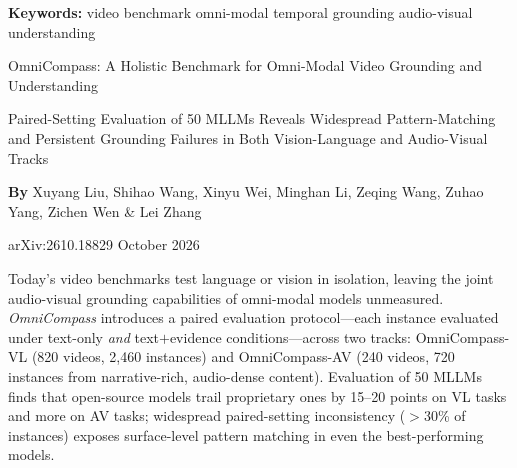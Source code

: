 \documentclass[10pt,twocolumn]{article}
\begin{document}
\setlength{\parindent}{0pt}
\setlength{\parskip}{4pt}

{\small\color{keywordgray}\textbf{Keywords:}
  video benchmark \textbullet{}
  omni-modal \textbullet{}
  temporal grounding \textbullet{}
  audio-visual understanding}\par\vspace{4pt}

{\LARGE\bfseries\raggedright
  OmniCompass: A Holistic Benchmark for Omni-Modal Video Grounding
  and Understanding}\par\vspace{4pt}

{\large\itshape\raggedright
  Paired-Setting Evaluation of 50 MLLMs Reveals Widespread
  Pattern-Matching and Persistent Grounding Failures in Both
  Vision-Language and Audio-Visual Tracks}\par\vspace{6pt}

{\small\textbf{By} Xuyang Liu, Shihao Wang, Xinyu Wei, Minghan Li,
  Zeqing Wang, Zuhao Yang, Zichen Wen \& Lei Zhang}\par\vspace{2pt}

{\small\color{keywordgray}arXiv:2610.18829 \textbullet{} October 2026}
\par\vspace{2pt}\noindent{\color{rulered}\rule{\columnwidth}{0.6pt}}\vspace{6pt}

Today's video benchmarks test language or vision in isolation, leaving
the joint audio-visual grounding capabilities of omni-modal models
unmeasured. \emph{OmniCompass} introduces a paired evaluation
protocol---each instance evaluated under text-only \emph{and}
text$+$evidence conditions---across two tracks: OmniCompass-VL
(820 videos, 2,460 instances) and OmniCompass-AV (240 videos, 720
instances from narrative-rich, audio-dense content). Evaluation of 50
MLLMs finds that open-source models trail proprietary ones by 15--20
points on VL tasks and more on AV tasks; widespread paired-setting
inconsistency ($>$30\% of instances) exposes surface-level pattern
matching in even the best-performing models.
\end{document}
